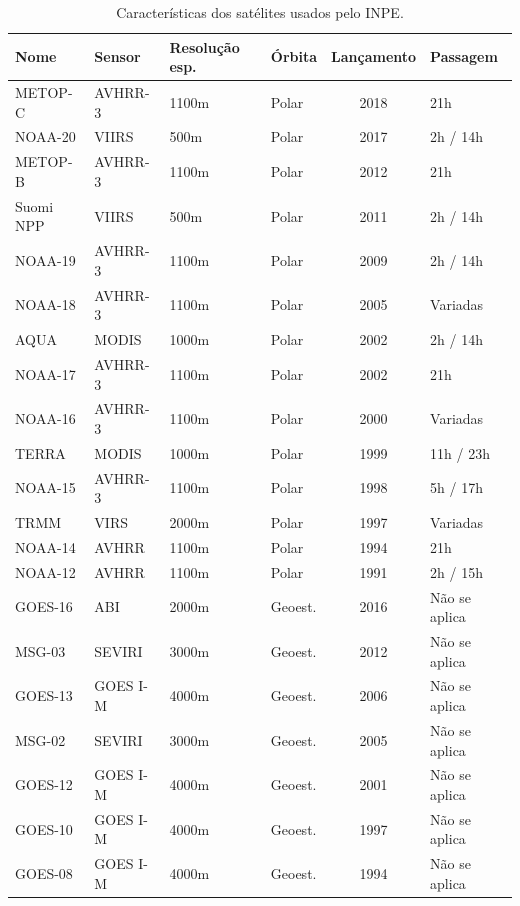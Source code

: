 \documentclass[cic,tc]{iiufrgs}
\begin{document}
\begin{table}[htbp]
\centering
\caption{Características dos satélites usados pelo INPE.}
\begin{tabular}{ @{}llllcl@{} }
  \toprule
  Nome    & Sensor & Resolução esp. & Órbita & Lançamento & Passagem \\
  \midrule
  METOP-C & AVHRR-3  & 1100m       & Polar   & 2018 & 21h \\
  NOAA-20 & VIIRS    & 500m        & Polar   & 2017 & 2h / 14h \\
  METOP-B & AVHRR-3  & 1100m       & Polar   & 2012 & 21h \\
  Suomi NPP & VIIRS  & 500m        & Polar   & 2011 & 2h / 14h \\
  NOAA-19 & AVHRR-3  & 1100m       & Polar   & 2009 & 2h / 14h \\
  NOAA-18 & AVHRR-3  & 1100m       & Polar   & 2005 & Variadas \\
  AQUA    & MODIS    & 1000m       & Polar   & 2002 & 2h / 14h \\
  NOAA-17 & AVHRR-3  & 1100m       & Polar   & 2002 & 21h \\
  NOAA-16 & AVHRR-3  & 1100m       & Polar   & 2000 & Variadas \\
  TERRA   & MODIS    & 1000m       & Polar   & 1999 & 11h / 23h \\
  NOAA-15 & AVHRR-3  & 1100m       & Polar   & 1998 & 5h / 17h \\
  TRMM    & VIRS     & 2000m       & Polar   & 1997 & Variadas \\
  NOAA-14 & AVHRR    & 1100m       & Polar   & 1994 & 21h \\
  NOAA-12 & AVHRR    & 1100m       & Polar   & 1991 & 2h / 15h \\
  GOES-16 & ABI      & 2000m       & Geoest. & 2016 & Não se aplica \\
  MSG-03  & SEVIRI   & 3000m       & Geoest. & 2012 & Não se aplica \\
  GOES-13 & GOES I-M & 4000m       & Geoest. & 2006 & Não se aplica \\
  MSG-02  & SEVIRI   & 3000m       & Geoest. & 2005 & Não se aplica \\
  GOES-12 & GOES I-M & 4000m       & Geoest. & 2001 & Não se aplica \\
  GOES-10 & GOES I-M & 4000m       & Geoest. & 1997 & Não se aplica \\
  GOES-08 & GOES I-M & 4000m       & Geoest. & 1994 & Não se aplica \\
  \bottomrule
\end{tabular}
\label{table:satelites}
\end{table}
\end{document}
